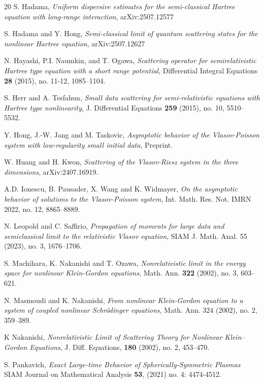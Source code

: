 \documentclass[reqno, 11pt, letterpaper]{amsart}
\theoremstyle{remark}
\numberwithin{equation}{section}
\numberwithin{theorem}{section}
\numberwithin{table}{section}
\numberwithin{figure}{section}
\begin{document}
\begin{thebibliography}{20}
S. Hadama, \emph{Uniform dispersive estimates for the semi-classical Hartree equation with long-range interaction}, arXiv:2507.12577

S. Hadama and Y. Hong, \emph{Semi-classical limit of quantum scattering states for the nonlinear Hartree equation}, arXiv:2507.12627

 N. Hayashi, P.I. Naumkin, and T. Ogawa, \emph{Scattering operator for semirelativistic Hartree type equation with a short range potential}, Differential Integral Equations \textbf{28} (2015), no. 11-12, 1085--1104.

 S. Herr and A. Tesfahun, \emph{Small data scattering for semi-relativistic equations with Hartree type nonlinearity}, J. Differential Equations \textbf{259} (2015), no. 10, 5510--5532.

 Y. Hong, J.-W. Jang and M. Taskovic, \emph{Asymptotic behavior of the Vlasov-Poisson system with low-regularity small initial data}, Preprint.

 W. Huang and H. Kwon, \emph{Scattering of the Vlasov-Riesz system in the three dimensions}, arXiv:2407.16919.

 A.D. Ionescu, B. Pausader, X. Wang and K. Widmayer, \emph{On the asymptotic behavior of solutions to the Vlasov-Poisson system}, Int. Math. Res. Not. IMRN 2022, no. 12, 8865--8889.

N. Leopold and C. Saffirio, \emph{Propagation of moments for large data and semiclassical limit to the relativistic Vlasov equation}, SIAM J. Math. Anal. 55 (2023), no. 3, 1676--1706.

S. Machihara, K. Nakanishi and T. Ozawa, \emph{Nonrelativistic limit in the energy space for nonlinear Klein-Gordon equations}, Math. Ann. \textbf{322} (2002), no. 3, 603--621.

N. Masmoudi and K. Nakanishi, \emph{From nonlinear Klein-Gordon equation to a system of coupled nonlinear Schrödinger equations}, Math. Ann. 324 (2002), no. 2, 359--389.

 K Nakanishi,
\emph{Nonrelativistic Limit of Scattering Theory for Nonlinear Klein–Gordon Equations},
J. Diff. Equations,
\textbf{180} (2002), no. 2, 453--470.

 S. Pankavich,
\emph{Exact Large-time Behavior of Spherically-Symmetric Plasmas} SIAM Journal on Mathematical Analysis \textbf{53}, (2021) no. 4: 4474-4512.


\end{thebibliography}
\end{document}
